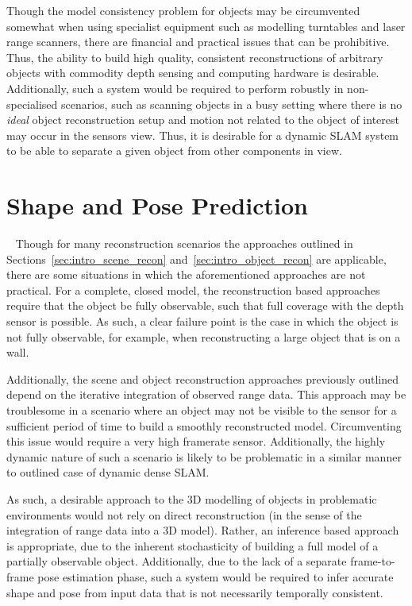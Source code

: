 Though the model consistency problem for objects may be circumvented somewhat when using specialist equipment 
such as modelling turntables and laser range scanners, there are financial and practical issues that can be 
prohibitive. Thus, the ability to build high quality, consistent reconstructions of arbitrary objects with 
commodity depth sensing and computing hardware is desirable. Additionally, such a system would be required to 
perform robustly in non-specialised scenarios, such as scanning objects in a busy setting where there is no 
\textit{ideal} object reconstruction setup and motion not related to the object of interest may occur in the 
sensors view. Thus, it is desirable for a dynamic SLAM system to be able to separate a given object from other 
components in view.

\section{Shape and Pose Prediction}
~\label{sec:intro_spp}
Though for many reconstruction scenarios the approaches outlined in Sections~\ref{sec:intro_scene_recon} 
and~\ref{sec:intro_object_recon} are applicable, there are some situations in which the aforementioned 
approaches are not practical. For a complete, closed model, the reconstruction based approaches require that 
the object be fully observable, such that full coverage with the depth sensor is possible. As such, a clear 
failure point is the case in which the object is not fully observable, for example, when reconstructing a large 
object that is on a wall.

Additionally, the scene and object reconstruction approaches previously outlined depend on the iterative 
integration of observed range data. This approach may be troublesome in a scenario where an object may not 
be visible to the sensor for a sufficient period of time to build a smoothly reconstructed model. Circumventing 
this issue would require a very high framerate sensor. Additionally, the highly dynamic nature of such a scenario 
is likely to be problematic in a similar manner to outlined case of dynamic dense SLAM\@.

As such, a desirable approach to the 3D modelling of objects in problematic environments would not rely on 
direct reconstruction (in the sense of the integration of range data into a 3D model). Rather, an inference based 
approach is appropriate, due to the inherent stochasticity of building a full model of a partially observable 
object. Additionally, due to the lack of a separate frame-to-frame pose estimation phase, such a system would 
be required to infer accurate shape and pose from input data that is not necessarily temporally consistent.

